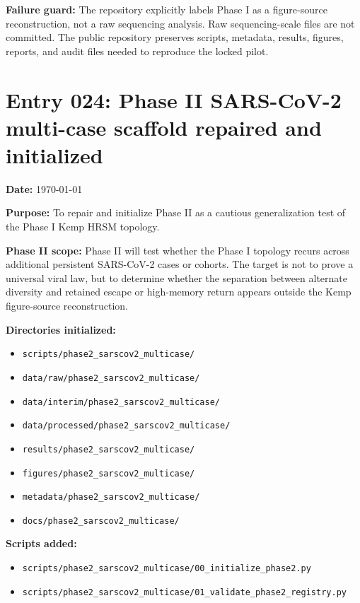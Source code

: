 \textbf{Failure guard:} The repository explicitly labels Phase I as a figure-source reconstruction, not a raw sequencing analysis. Raw sequencing-scale files are not committed. The public repository preserves scripts, metadata, results, figures, reports, and audit files needed to reproduce the locked pilot.


\section*{Entry 024: Phase II SARS-CoV-2 multi-case scaffold repaired and initialized}

\textbf{Date:} \today

\textbf{Purpose:} To repair and initialize Phase II as a cautious generalization test of the Phase I Kemp HRSM topology.

\textbf{Phase II scope:} Phase II will test whether the Phase I topology recurs across additional persistent SARS-CoV-2 cases or cohorts. The target is not to prove a universal viral law, but to determine whether the separation between alternate diversity and retained escape or high-memory return appears outside the Kemp figure-source reconstruction.

\textbf{Directories initialized:}
\begin{itemize}
    \item \texttt{scripts/phase2\_sarscov2\_multicase/}
    \item \texttt{data/raw/phase2\_sarscov2\_multicase/}
    \item \texttt{data/interim/phase2\_sarscov2\_multicase/}
    \item \texttt{data/processed/phase2\_sarscov2\_multicase/}
    \item \texttt{results/phase2\_sarscov2\_multicase/}
    \item \texttt{figures/phase2\_sarscov2\_multicase/}
    \item \texttt{metadata/phase2\_sarscov2\_multicase/}
    \item \texttt{docs/phase2\_sarscov2\_multicase/}
\end{itemize}

\textbf{Scripts added:}
\begin{itemize}
    \item \texttt{scripts/phase2\_sarscov2\_multicase/00\_initialize\_phase2.py}
    \item \texttt{scripts/phase2\_sarscov2\_multicase/01\_validate\_phase2\_registry.py}
\end{itemize}

